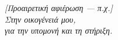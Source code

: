 \cleardoublepage
\thispagestyle{empty}
\vspace*{0.3\textheight}
\begin{flushright}
  \itshape
  [Προαιρετική αφιέρωση — π.χ.]\\[0.3cm]
  Στην οικογένειά μου,\\
  για την υπομονή και τη στήριξη.
\end{flushright}
